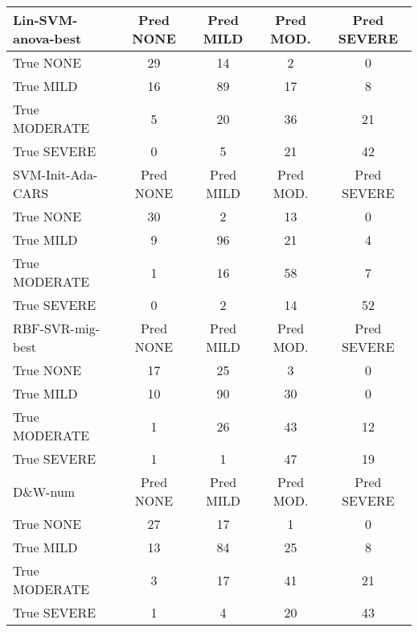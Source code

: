 {\begin{table}
\centering
    \begin{tabular}{|l|c|c|c|c|}
    \hline
   \cellcolor{gray!15} \textsf{Lin-SVM-anova-best} & \textsf{Pred NONE} & \textsf{Pred MILD} & \textsf{Pred MOD.} & \textsf{Pred SEVERE} \\
   \hline
   \textsf{True NONE} & \cellcolor{gray!15} 29 & 14 & 2 & 0 \\
   \textsf{True MILD} & 16 & \cellcolor{gray!15} 89 & 17 & 8 \\
   \textsf{True MODERATE} & 5 & 20 & \cellcolor{gray!15} 36 & 21 \\
   \textsf{True SEVERE} & 0 & 5 & 21 & \cellcolor{gray!15} 42 \\
   \hline
   \cellcolor{gray!15} \textsf{SVM-Init-Ada-CARS} & \textsf{Pred NONE} & \textsf{Pred MILD} & \textsf{Pred MOD.} & \textsf{Pred SEVERE} \\
   \hline
   \textsf{True NONE} & \cellcolor{gray!15} 30 & 2 & 13 & 0 \\
   \textsf{True MILD} & 9 & \cellcolor{gray!15} 96 & 21 & 4 \\
   \textsf{True MODERATE} & 1 & 16 & \cellcolor{gray!15} 58 & 7 \\
   \textsf{True SEVERE} & 0 & 2 & 14 & \cellcolor{gray!15} 52 \\
   \hline
   \cellcolor{gray!15} \textsf{RBF-SVR-mig-best} & \textsf{Pred NONE} & \textsf{Pred MILD} & \textsf{Pred MOD.} & \textsf{Pred SEVERE} \\
   \hline
   \textsf{True NONE} & \cellcolor{gray!15} 17 & 25 & 3 & 0 \\
   \textsf{True MILD} & 10 & \cellcolor{gray!15} 90 & 30 & 0 \\
   \textsf{True MODERATE} & 1 & 26 & \cellcolor{gray!15} 43 & 12 \\
   \textsf{True SEVERE} & 1 & 1 & 47 & \cellcolor{gray!15} 19 \\
   \hline
   \cellcolor{gray!15} \textsf{D\&W-num} & \textsf{Pred NONE} & \textsf{Pred MILD} & \textsf{Pred MOD.} & \textsf{Pred SEVERE} \\
   \hline
   \textsf{True NONE} & \cellcolor{gray!15} 27 & 17 & 1 & 0 \\
   \textsf{True MILD} & 13 & \cellcolor{gray!15} 84 & 25 & 8 \\
   \textsf{True MODERATE} & 3 & 17 & \cellcolor{gray!15} 41 & 21 \\
   \textsf{True SEVERE} & 1 & 4 & 20 & \cellcolor{gray!15} 43 \\

\end{tabular}
\end{table}}
